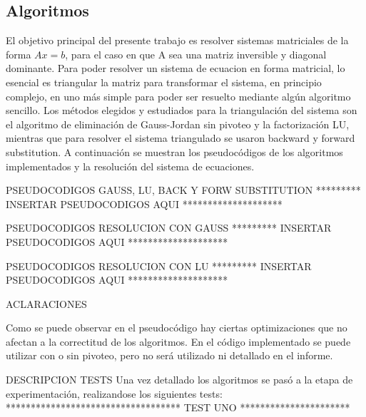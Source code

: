 \subsection{Algoritmos}

El objetivo principal del presente trabajo es resolver sistemas matriciales de la forma $Ax = b$, para el caso en que A sea una matriz inversible y diagonal dominante. Para poder resolver un sistema de ecuacion en forma matricial, lo esencial es triangular la matriz para transformar el sistema, en principio complejo, en uno más simple para poder ser resuelto mediante algún algoritmo sencillo.
Los métodos elegidos y estudiados para la triangulación del sistema son el algoritmo de eliminación de Gauss-Jordan sin pivoteo y la factorización LU, mientras que para resolver el sistema triangulado se usaron backward y forward substitution. A continuación se muestran los pseudocódigos de los algoritmos implementados y la resolución del sistema de ecuaciones.



PSEUDOCODIGOS GAUSS, LU, BACK Y FORW SUBSTITUTION
*********		INSERTAR PSEUDOCODIGOS AQUI		********************

PSEUDOCODIGOS RESOLUCION CON GAUSS
*********		INSERTAR PSEUDOCODIGOS AQUI		********************

PSEUDOCODIGOS RESOLUCION CON LU
*********		INSERTAR PSEUDOCODIGOS AQUI		********************

ACLARACIONES

Como se puede observar en el pseudocódigo hay ciertas optimizaciones que no afectan a la correctitud de los algoritmos.
En el código implementado se puede utilizar con o sin pivoteo, pero no será utilizado ni detallado en el informe.


DESCRIPCION TESTS
Una vez detallado los algoritmos se pasó a la etapa de experimentación, realizandose los siguientes tests:
*********************************** TEST UNO	**********************




